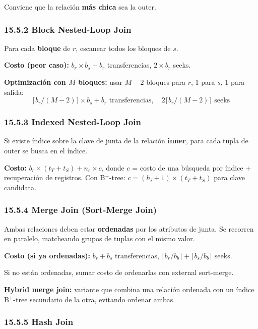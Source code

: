 \documentclass[11pt, a4paper]{article}
\begin{document}
Conviene que la relación \textbf{más chica} sea la outer.

\subsubsection{15.5.2 Block Nested-Loop Join}

Para cada \textbf{bloque} de $r$, escanear todos los bloques de $s$.

\textbf{Costo (peor caso):} $b_r \times b_s + b_r$ transferencias, $2 \times b_r$ seeks.

\textbf{Optimización con $M$ bloques:} usar $M - 2$ bloques para $r$, 1 para $s$, 1 para salida:
\[
	\lceil b_r / (M-2) \rceil \times b_s + b_r \text{ transferencias}, \quad 2 \lceil b_r / (M-2) \rceil \text{ seeks}
\]

\subsubsection{15.5.3 Indexed Nested-Loop Join}

Si existe índice sobre la clave de junta de la relación \textbf{inner}, para cada tupla de outer se busca en el índice.

\textbf{Costo:} $b_r \times (t_T + t_S) + n_r \times c$, donde $c$ = costo de una búsqueda por índice + recuperación de registros. Con B$^+$-tree: $c = (h_i + 1) \times (t_T + t_S)$ para clave candidata.

\subsubsection{15.5.4 Merge Join (Sort-Merge Join)}

Ambas relaciones deben estar \textbf{ordenadas} por los atributos de junta. Se recorren en paralelo, matcheando grupos de tuplas con el mismo valor.

\textbf{Costo (si ya ordenadas):} $b_r + b_s$ transferencias, $\lceil b_r / b_b \rceil + \lceil b_s / b_b \rceil$ seeks.

Si no están ordenadas, sumar costo de ordenarlas con external sort-merge.

\textbf{Hybrid merge join:} variante que combina una relación ordenada con un índice B$^+$-tree secundario de la otra, evitando ordenar ambas.

\subsubsection{15.5.5 Hash Join}
\end{document}
